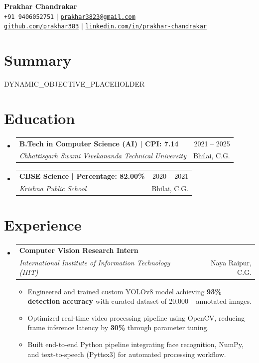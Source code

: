 \documentclass[letterpaper,11pt]{article}
\makeatletter
\newcommand{\resumeItem}[1]{
  \item\small{
    {#1 \vspace{-2pt}} %
  }
}
\newcommand{\resumeSubheading}[4]{
  \vspace{-1pt}\item
    \begin{tabular*}{\textwidth}[t]{l@{\extracolsep{\fill}}r}
      \textbf{#1} & {\color{dark-grey}\small #2}\vspace{1pt}\\ 
      \textit{#3} & {\color{dark-grey} \small #4}\\ 
    \end{tabular*}\vspace{-6pt} %
}
\newcommand{\resumeSubHeadingListStart}{\begin{itemize}[leftmargin=0in, label={}]}
\newcommand{\resumeSubHeadingListEnd}{\end{itemize}\vspace{-2pt}}
\newcommand{\resumeItemListStart}{\begin{itemize}}
\newcommand{\resumeItemListEnd}{\end{itemize}\vspace{-4pt}}
\makeatother
\begin{document}
\begin{center}
    \textbf{\Huge Prakhar Chandrakar} \\ \vspace{4pt}
    \small \faPhone* \texttt{+91 9406052751} \hspace{2pt} $|$ \hspace{2pt}
    \faEnvelope \hspace{2pt} \href{mailto:prakhar3823@gmail.com}{\texttt{prakhar3823@gmail.com}} \\ \vspace{2pt}
    \faGithub \hspace{2pt} \href{https://github.com/prakhar383}{\texttt{github.com/prakhar383}} \hspace{2pt} $|$ \hspace{2pt}
    \faLinkedin \hspace{2pt} \href{https://www.linkedin.com/in/prakhar-chandrakar-2405b93b3/}{\texttt{linkedin.com/in/prakhar-chandrakar}}
    \\ \vspace{-4pt}
\end{center} 

\section{Summary}
\vspace{1pt}
\small{{{DYNAMIC_OBJECTIVE_PLACEHOLDER}}}
\vspace{2pt}

\section{Education}
  \resumeSubHeadingListStart
    \resumeSubheading
      {B.Tech in Computer Science (AI) | CPI: 7.14}{2021 -- 2025}
      {Chhattisgarh Swami Vivekananda Technical University}{Bhilai, C.G.}
    \resumeSubheading
      {CBSE Science | Percentage: 82.00\%}{2020 -- 2021}
      {Krishna Public School}{Bhilai, C.G.}
  \resumeSubHeadingListEnd

\section{Experience}
  \resumeSubHeadingListStart
    \resumeSubheading
      {Computer Vision Research Intern}{}
      {International Institute of Information Technology (IIIT)}{Naya Raipur, C.G.}
      \resumeItemListStart
        \resumeItem{Engineered and trained custom YOLOv8 model achieving \textbf{93\% detection accuracy} with curated dataset of 20,000+ annotated images.}
        \resumeItem{Optimized real-time video processing pipeline using OpenCV, reducing frame inference latency by \textbf{30\%} through parameter tuning.}
        \resumeItem{Built end-to-end Python pipeline integrating face recognition, NumPy, and text-to-speech (Pyttsx3) for automated processing workflow.}
      \resumeItemListEnd
  \resumeSubHeadingListEnd
\end{document}
